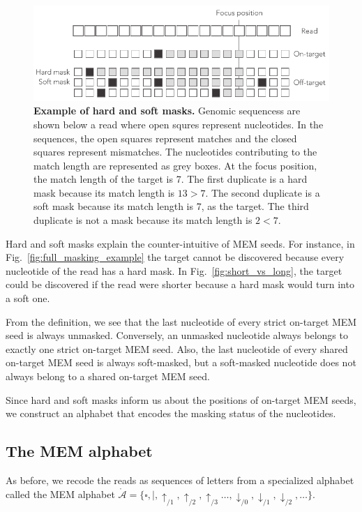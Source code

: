 \documentclass{article}
\begin{document}
\begin{figure}[h]
\centering
\includegraphics[scale=0.85]{hard_vs_soft_masks.pdf}
\caption{\textbf{Example of hard and soft masks.}
Genomic sequencess are shown below a read where open squres represent
nucleotides. In the sequences, the open squares represent matches and the
closed squares represent mismatches. The nucleotides contributing to the
match length are represented as grey boxes. At the focus position, the
match length of the target is 7. The first duplicate is a hard mask
because its match length is $13>7$. The second duplicate is a soft mask
because its match length is 7, as the target. The third duplicate is not
a mask because its match length is $2<7$.}
\label{fig:hard_vs_soft_masks}
\end{figure}

Hard and soft masks explain the counter-intuitive of MEM seeds. For
instance, in Fig.~\ref{fig:full_masking_example} the target cannot be
discovered because every nucleotide of the read has a hard mask. In
Fig.~\ref{fig:short_vs_long}, the target could be discovered if the read
were shorter because a hard mask would turn into a soft one.

From the definition, we see that the last nucleotide of every strict
on-target MEM seed is always unmasked. Conversely, an unmasked nucleotide
always belongs to exactly one strict on-target MEM seed. Also, the last
nucleotide of every shared on-target MEM seed is always soft-masked, but a
soft-masked nucleotide does not always belong to a shared on-target MEM
seed.

Since hard and soft masks inform us about the positions of on-target
MEM seeds, we construct an alphabet that encodes the masking status of the
nucleotides.

\subsection{The MEM alphabet}

As before, we recode the reads as sequences of letters from a specialized
alphabet called the MEM alphabet $\mathring{\mathcal{A}} = \{\square, |,
\uparrow_{/1}, \uparrow_{/2}, \uparrow_{/3} \ldots, \downarrow_{/0},
\downarrow_{/1}, \downarrow_{/2}, \ldots\}$.
\end{document}
